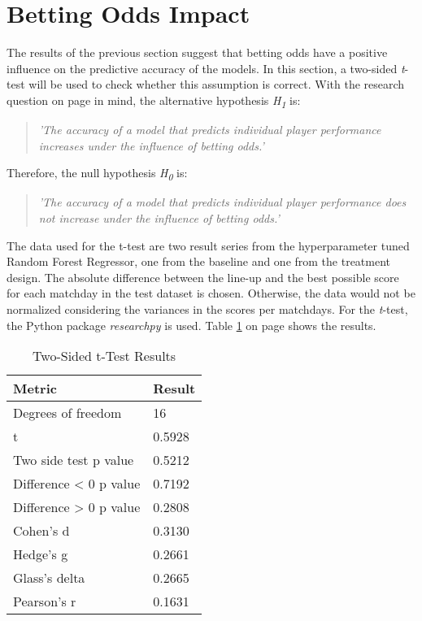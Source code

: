 \section{Betting Odds Impact}

The results of the previous section suggest that betting odds have a positive influence on the predictive accuracy of the models. In this section, a two-sided \emph{t}-test will be used to check whether this assumption is correct. With the research question on page \pageref{research_question} in mind, the alternative hypothesis \emph{H\textsubscript{1}} is: 

\begin{quote}
    \centering
    \emph{'The accuracy of a model that predicts individual player performance increases under the influence of betting odds.'}
\end{quote}

Therefore, the null hypothesis \emph{H\textsubscript{0}} is:

\begin{quote}
    \centering
    \emph{'The accuracy of a model that predicts individual player performance does not increase under the influence of betting odds.'}
\end{quote}

The data used for the t-test are two result series from the hyperparameter tuned Random Forest Regressor, one from the baseline and one from the treatment design. The absolute difference between the line-up and the best possible score for each matchday in the test dataset is chosen. Otherwise, the data would not be normalized considering the variances in the scores per matchdays. For the \emph{t}-test, the Python package \emph{researchpy} is used. Table \ref{tab:t-test} on page \pageref{tab:t-test} shows the results. 

\begin{table}[H]
    \centering
    \captionsetup{justification=centering}
    \caption{Two-Sided t-Test Results}
    \renewcommand{\arraystretch}{1.25}
    \setlength{\tabcolsep}{10pt}
    \label{tab:t-test}
    \begin{tabular}{@{}ll@{}}
    \toprule
    \textbf{Metric} & \textbf{Result} \\ \midrule
    Degrees of freedom      & 16 \\
    t                       & 0.5928 \\
    Two side test p value   & 0.5212 \\
    Difference < 0 p value  & 0.7192 \\
    Difference > 0 p value  & 0.2808 \\
    Cohen's d               & 0.3130 \\
    Hedge's g               & 0.2661 \\
    Glass's delta           & 0.2665 \\
    Pearson's r             & 0.1631 \\ \bottomrule
    \end{tabular}
\end{table}

